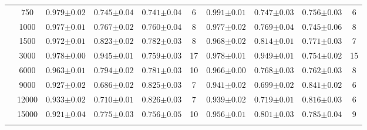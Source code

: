 \begin{table}[H]
\begin{tabularx}{\textwidth}{cc | YYYc | YYYc }
        & 750 & $0.979{\scriptscriptstyle\pm0.02}$ & $0.745{\scriptscriptstyle\pm0.04}$ & $0.741{\scriptscriptstyle\pm0.04}$ & 6 & $0.991{\scriptscriptstyle\pm0.01}$ & $0.747{\scriptscriptstyle\pm0.03}$ & $0.756{\scriptscriptstyle\pm0.03}$ & 6\\
        & 1000 & $0.977{\scriptscriptstyle\pm0.01}$ & $0.767{\scriptscriptstyle\pm0.02}$ & $0.760{\scriptscriptstyle\pm0.04}$ & 8 & $0.977{\scriptscriptstyle\pm0.02}$ & $0.769{\scriptscriptstyle\pm0.04}$ & $0.745{\scriptscriptstyle\pm0.06}$ & 8\\
        & 1500 & $0.972{\scriptscriptstyle\pm0.01}$ & $0.823{\scriptscriptstyle\pm0.02}$ & $0.782{\scriptscriptstyle\pm0.03}$ & 8 & $0.968{\scriptscriptstyle\pm0.02}$ & $0.814{\scriptscriptstyle\pm0.01}$ & $0.771{\scriptscriptstyle\pm0.03}$ & 7\\
        & 3000 & $0.978{\scriptscriptstyle\pm0.00}$ & $0.945{\scriptscriptstyle\pm0.01}$ & $0.759{\scriptscriptstyle\pm0.03}$ & 17 & $0.978{\scriptscriptstyle\pm0.01}$ & $0.949{\scriptscriptstyle\pm0.01}$ & $0.754{\scriptscriptstyle\pm0.02}$ & 15\\
        & 6000 & $0.963{\scriptscriptstyle\pm0.01}$ & $0.794{\scriptscriptstyle\pm0.02}$ & $0.781{\scriptscriptstyle\pm0.03}$ & 10 & $0.966{\scriptscriptstyle\pm0.00}$ & $0.768{\scriptscriptstyle\pm0.03}$ & $0.762{\scriptscriptstyle\pm0.03}$ & 8\\
        & 9000 & $0.927{\scriptscriptstyle\pm0.02}$ & $0.686{\scriptscriptstyle\pm0.02}$ & $0.825{\scriptscriptstyle\pm0.03}$ & 7 & $0.941{\scriptscriptstyle\pm0.02}$ & $0.699{\scriptscriptstyle\pm0.02}$ & $0.841{\scriptscriptstyle\pm0.02}$ & 6\\
        & 12000 & $0.933{\scriptscriptstyle\pm0.02}$ & $0.710{\scriptscriptstyle\pm0.01}$ & $0.826{\scriptscriptstyle\pm0.03}$ & 7 & $0.939{\scriptscriptstyle\pm0.02}$ & $0.719{\scriptscriptstyle\pm0.01}$ & $0.816{\scriptscriptstyle\pm0.03}$ & 6\\
        & 15000 & $0.921{\scriptscriptstyle\pm0.04}$ & $0.775{\scriptscriptstyle\pm0.03}$ & $0.756{\scriptscriptstyle\pm0.05}$ & 10 & $0.956{\scriptscriptstyle\pm0.01}$ & $0.801{\scriptscriptstyle\pm0.03}$ & $0.785{\scriptscriptstyle\pm0.04}$ & 9\\
        \\
    \end{tabularx}
\end{table}
\clearpage


